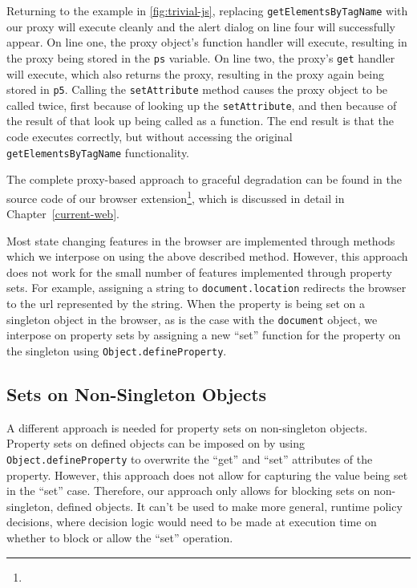 Returning to the example in \ref{fig:trivial-js}, replacing
\texttt{getElementsByTagName} with our proxy will execute cleanly and the alert
dialog on line four will successfully appear.  On line one, the proxy object's
function handler will execute, resulting in the proxy being stored in the
\texttt{ps} variable.  On line two, the proxy's \texttt{get} handler will
execute, which also returns the proxy, resulting in the proxy again being
stored in \texttt{p5}.  Calling the \texttt{setAttribute} method causes the
proxy object to be called twice, first because of looking up the
\texttt{setAttribute}, and then because of the result of that look up being
called as a function.  The end result is that the code executes correctly, but
without accessing the original \texttt{getElementsByTagName} functionality.

The complete proxy-based approach to graceful degradation can be found in
the source code of our browser extension\footnote{\ExtensionSourceUrl}, which
is discussed in detail in Chapter~\ref{current-web}.

Most state changing features in the browser are implemented through methods
which we interpose on using the above described method.  However, this approach
does not work for the small number of features implemented through property sets.
For example, assigning a string to \texttt{document.location} redirects
the browser to the \gls{url} represented by the string.  When the property is
being set on a singleton object in the browser, as is the case with the
\texttt{document} object, we interpose on property sets by assigning a new
``set'' function for the property on the singleton using
\texttt{Object.defineProperty}.


\subsection{Sets on Non-Singleton Objects}
\label{cost-benefit:intercepting-js:proxy-non-singletons}
A different approach is needed for property sets on non-singleton objects.
Property sets on \WAPI defined objects can be imposed on by using
\texttt{Object.defineProperty} to overwrite the ``get'' and ``set'' attributes
of the property.  However, this approach does not allow for capturing the value
being set in the ``set'' case.  Therefore, our approach only allows for
blocking sets on non-singleton, \WAPI defined objects.  It can't be used to
make more general, runtime policy decisions, where decision logic would need to
be made at execution time on whether to block or allow the ``set'' operation.


